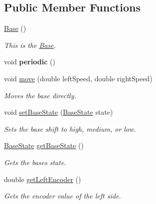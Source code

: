 \subsection*{Public Member Functions}
\begin{DoxyCompactItemize}
\item 
\mbox{\label{classfrc_1_1robot_1_1subsystems_1_1_base_ac20004b7dc16baa244dab512a5974843}} 
\mbox{\hyperlink{classfrc_1_1robot_1_1subsystems_1_1_base_ac20004b7dc16baa244dab512a5974843}{Base}} ()
\begin{DoxyCompactList}\small\item\em This is the \mbox{\hyperlink{classfrc_1_1robot_1_1subsystems_1_1_base}{Base}}. \end{DoxyCompactList}\item 
\mbox{\label{classfrc_1_1robot_1_1subsystems_1_1_base_a22ede64b3ec77a28a1ca7d8dfcd88ba9}} 
void {\bfseries periodic} ()
\item 
void \mbox{\hyperlink{classfrc_1_1robot_1_1subsystems_1_1_base_aa41ac2660df6722e9d0c9e143c82fe81}{move}} (double left\+Speed, double right\+Speed)
\begin{DoxyCompactList}\small\item\em Moves the base directly. \end{DoxyCompactList}\item 
void \mbox{\hyperlink{classfrc_1_1robot_1_1subsystems_1_1_base_a4ec90478ab5deafb1910a2715e7a8860}{set\+Base\+State}} (\mbox{\hyperlink{enumfrc_1_1robot_1_1enums_1_1_base_state}{Base\+State}} state)
\begin{DoxyCompactList}\small\item\em Sets the base shift to high, medium, or low. \end{DoxyCompactList}\item 
\mbox{\hyperlink{enumfrc_1_1robot_1_1enums_1_1_base_state}{Base\+State}} \mbox{\hyperlink{classfrc_1_1robot_1_1subsystems_1_1_base_ac08c09ed7a53f8c5ac883c4b0fe5fbf4}{get\+Base\+State}} ()
\begin{DoxyCompactList}\small\item\em Gets the base\textquotesingle{}s state. \end{DoxyCompactList}\item 
double \mbox{\hyperlink{classfrc_1_1robot_1_1subsystems_1_1_base_a008f98f74ff02b06456cb913ae634bdc}{get\+Left\+Encoder}} ()
\begin{DoxyCompactList}\small\item\em Gets the encoder value of the left side. \end{DoxyCompactList}\item 

\end{DoxyCompactItemize}
